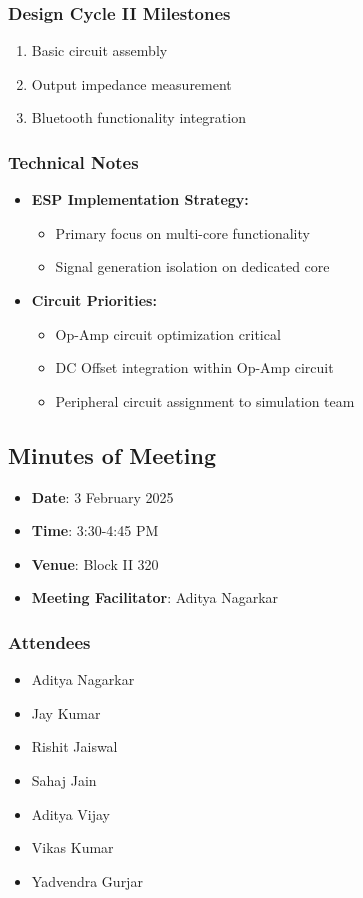 \documentclass[12pt,a4paper]{article}
\begin{document}
\subsubsection*{Design Cycle II Milestones}
\begin{enumerate}
    \item Basic circuit assembly
    \item Output impedance measurement
    \item Bluetooth functionality integration
\end{enumerate}

\subsubsection*{Technical Notes}
\begin{itemize}
    \item \textbf{ESP Implementation Strategy:}
    \begin{itemize}
        \item Primary focus on multi-core functionality
        \item Signal generation isolation on dedicated core
    \end{itemize}
    \item \textbf{Circuit Priorities:}
    \begin{itemize}
        \item Op-Amp circuit optimization critical
        \item DC Offset integration within Op-Amp circuit
        \item Peripheral circuit assignment to simulation team
    \end{itemize}
\end{itemize}

\subsection*{Minutes of Meeting}
\begin{itemize}
    \item \textbf{Date}: 3 February 2025
    \item \textbf{Time}: 3:30-4:45 PM
    \item \textbf{Venue}: Block II 320
    \item \textbf{Meeting Facilitator}: Aditya Nagarkar
\end{itemize}

\subsubsection*{Attendees}
\begin{itemize}
    \item Aditya Nagarkar
    \item Jay Kumar
    \item Rishit Jaiswal
    \item Sahaj Jain
    \item Aditya Vijay
    \item Vikas Kumar
    \item Yadvendra Gurjar
\end{itemize}
\end{document}
